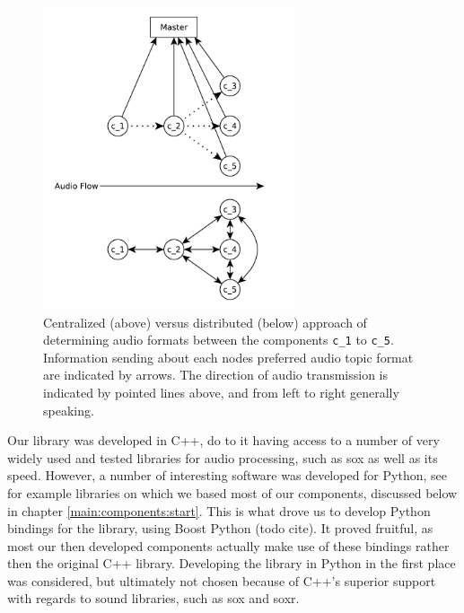 \begin{figure}[]
	\centering
	\includegraphics[width=0.66\textwidth]{diagrams/lib_central_vs_dist.pdf}
	\caption{Centralized (above) versus distributed (below) approach of determining audio formats between the components \texttt{c\_1} to \texttt{c\_5}.
		Information sending about each nodes preferred audio topic format are indicated by arrows.
		The direction of audio transmission is indicated by pointed lines above, and from left to right generally speaking.}
	\label{pic:main:lib:central_vs_dist}
\end{figure}

Our library was developed in C++, do to it having access to a number of very widely used and tested libraries for audio processing, such as \gls{sox} as well as its speed.
However, a number of interesting software was developed for Python, see for example libraries on which we based most of our components, discussed below in chapter \ref{main:components:start}.
This is what drove us to develop Python bindings for the library, using Boost Python (todo cite).
It proved fruitful, as most our then developed components actually make use of these bindings rather then the original C++ library.
Developing the library in Python in the first place was considered, but ultimately not chosen because of C++'s superior support with regards to sound libraries, such as \gls{sox} and \gls{soxr}.

